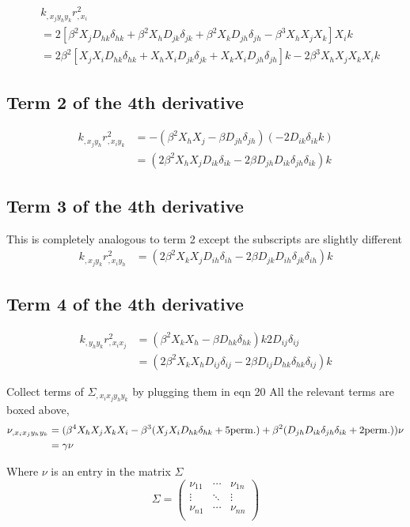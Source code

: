 \begin{align*}
&k_{,x_j y_h y_k} r_{,x_i}^2\\
&= 2[\beta^2 X_j D_{hk} \delta_{hk} + \beta^2 X_h D_{jk}\delta_{jk} +
\beta^2 X_k D_{jh} \delta_{jh} - \beta^3 X_h X_j X_k] X_i k\\ 
&=\boxed{2\beta^2[ 
X_j X_i D_{hk} \delta_{hk} + 
X_h X_i D_{jk} \delta_{jk} + 
X_k X_i D_{jh} \delta_{jh}] k  
- 2\beta^3 X_h X_j X_k X_i k} 
\end{align*}

\subsection{Term 2 of the 4th derivative}
\begin{align*}
k_{,x_j y_h} r^2_{,x_i y_k}
&= - (\beta^2 X_h X_j - \beta D_{jh} \delta_{jh}) (-2D_{ik} \delta_{ik}k) \\  
&= \boxed{( 2 \beta^2  X_h X_j D_{ik} \delta_{ik} 
-2 \beta D_{jh} D_{ik} \delta_{jh} \delta_{ik}) k} 
\end{align*}

\subsection{Term 3 of the 4th derivative}
This is completely analogous to term 2 except the subscripts are slightly
different
\begin{align*}
k_{,x_j y_k} r^2_{,x_i y_h}
&=\boxed { ( 2 \beta^2  X_k X_j D_{ih} \delta_{ih} 
-2 \beta D_{jk} D_{ih} \delta_{jk} \delta_{ih}) k} 
\end{align*}

\subsection{Term 4 of the 4th derivative} 
\begin{align*}
k_{,y_h y_k} r^2_{,x_i x_j}
&= (\beta^2 X_k X_h - \beta D_{hk}\delta_{hk})k 2 D_{ij} \delta_{ij}\\ 
&= \boxed{(2\beta^2 X_k X_h D_{ij} \delta_{ij} - 2\beta D_{ij} D_{hk} \delta_{hk}
\delta_{ij})k } 
\end{align*}

Collect terms of $\Sigma_{,x_i x_j y_h y_k}$ by plugging them in eqn 20 
All the relevant terms are boxed above, 
\begin{align}
\nu_{,x_i x_j y_h y_k} &= (\beta^4 X_h X_j X_k X_i -  
\beta^3 (X_j X_i D_{hk} \delta_{hk} + 5 {\rm perm.}) + \beta^2
(D_{jh} D_{ik}\delta_{jh}\delta_{ik} + 2 {\rm perm.})) \nu \\
&= \gamma \nu
\end{align}

Where $\nu$ is an entry in the matrix $\Sigma$
\begin{equation}
\Sigma  = 
\left(
\begin{array}{ccc}
\nu_{11} & \cdots & \nu_{1n} \\
\vdots & \ddots & \vdots \\
\nu_{n1} & \cdots & \nu_{nn} \\
\end{array}
\right)
\end{equation}


